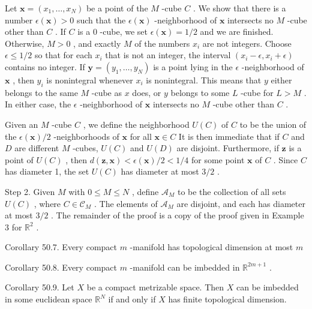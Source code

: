 Let \(\mathbf{x} = \left( {{x}_{1},\ldots ,{x}_{N}}\right)\) be a point of the \(M\) -cube \(C\) . We show that there is a number \(\epsilon \left( \mathbf{x}\right)  > 0\) such that the \(\epsilon \left( \mathbf{x}\right)\) -neighborhood of \(\mathbf{x}\) intersects no \(M\) -cube other than \(C\) . If \(C\) is a 0 -cube, we set \(\epsilon \left( \mathbf{x}\right)  = 1/2\) and we are finished. Otherwise, \(M > 0\) , and exactly \(M\) of the numbers \({x}_{i}\) are not integers. Choose \(\epsilon  \leq  1/2\) so that for each \({x}_{i}\) that is not an integer, the interval \(\left( {{x}_{i} - \epsilon ,{x}_{i} + \epsilon }\right)\) contains no integer. If \(\mathbf{y} = \left( {{y}_{1},\ldots ,{y}_{N}}\right)\) is a point lying in the \(\epsilon\) -neighborhood of \(\mathbf{x}\) , then \({y}_{i}\) is nonintegral whenever \({x}_{i}\) is nonintegral. This means that \(y\) either belongs to the same \(M\) -cube as \(x\) does, or \(y\) belongs to some \(L\) -cube for \(L > M\) . In either case, the \(\epsilon\) -neighborhood of \(\mathbf{x}\) intersects no \(M\) -cube other than \(C\) .

Given an \(M\) -cube \(C\) , we define the neighborhood \(U\left( C\right)\) of \(C\) to be the union of the \(\epsilon \left( \mathbf{x}\right) /2\) -neighborhoods of \(\mathbf{x}\) for all \(\mathbf{x} \in  C\) It is then immediate that if \(C\) and \(D\) are different \(M\) -cubes, \(U\left( C\right)\) and \(U\left( D\right)\) are disjoint. Furthermore, if \(\mathbf{z}\) is a point of \(U\left( C\right)\) , then \(d\left( {\mathbf{z},\mathbf{x}}\right)  < \epsilon \left( \mathbf{x}\right) /2 < 1/4\) for some point \(\mathbf{x}\) of \(C\) . Since \(C\) has diameter 1, the set \(U\left( C\right)\) has diameter at most \(3/2\) .

Step 2. Given \(M\) with \(0 \leq  M \leq  N\) , define \({\mathcal{A}}_{M}\) to be the collection of all sets \(U\left( C\right)\) , where \(C \in  {\mathcal{C}}_{M}\) . The elements of \({\mathcal{A}}_{M}\) are disjoint, and each has diameter at most \(3/2\) . The remainder of the proof is a copy of the proof given in Example 3 for \({\mathbb{R}}^{2}\) .

Corollary 50.7. Every compact \(m\) -manifold has topological dimension at most \(m\)

Corollary 50.8. Every compact \(m\) -manifold can be imbedded in \({\mathbb{R}}^{{2m} + 1}\) .

Corollary 50.9. Let \(X\) be a compact metrizable space. Then \(X\) can be imbedded in some euclidean space \({\mathbb{R}}^{N}\) if and only if \(X\) has finite topological dimension.

